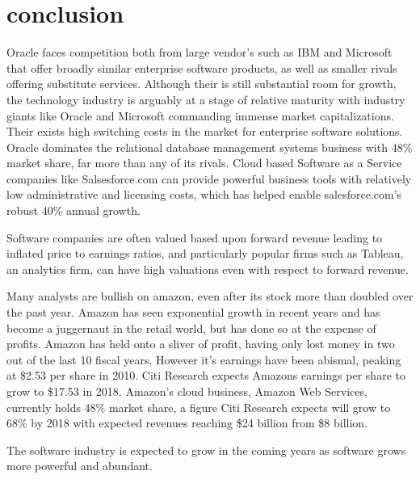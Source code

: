 \section*{conclusion}

Oracle faces competition both from large vendor's such as IBM and Microsoft that offer broadly similar enterprise software products, as well as smaller rivals offering substitute services.\autocite[]{finkle2012larry}
Although their is still substantial room for growth, the technology industry is arguably at a stage of relative maturity with industry giants like Oracle and Microsoft commanding immense market capitalizations.\autocite[]{finkle2012larry}
Their exists high switching costs in the market for enterprise software solutions.\autocite[]{finkle2012larry}
Oracle dominates the relational database management systems business with 48\% market share, far more than any of its rivals.\autocite[]{finkle2012larry}
Cloud based Software as a Service companies like Salsesforce.com can provide powerful business tools with relatively low administrative and licensing costs, which has helped enable salesforce.com's robust 40\% annual growth.\autocite[]{HorizontalPlaysTechnology}


Software companies are often valued based upon forward revenue leading to inflated price to earnings ratios, and particularly popular firms such as Tableau, an analytics firm, can have high valuations even with respect to forward revenue.\autocite[]{HorizontalPlaysTechnology}

Many analysts are bullish on amazon, even after its stock more than doubled over the past year.\autocite[]{AmazonDouble}
Amazon has seen exponential growth in recent years and has become a juggernaut in the retail world, but has done so at the expense of profits.\autocite[]{AmazonProfit}
Amazon has held onto a sliver of profit, having only lost money in two out of the last 10 fiscal years. However it's earnings have been abismal, peaking at \$2.53 per share in 2010.\autocite[]{AmazonProfit}
Citi Research expects Amazons earnings per share to grow to \$17.53 in 2018.\autocite[]{AmazonProfit}
Amazon's cloud business, Amazon Web Services, currently holds 48\% market share, a figure Citi Research expects will grow to 68\% by 2018 with expected revenues reaching \$24 billion from \$8 billion.\autocite[]{AmazonProfit}

The software industry is expected to grow in the coming years as software grows more powerful and abundant.\autocite[21]{SurveysSoftware2015}
